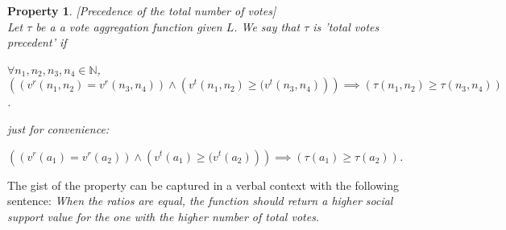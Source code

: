 \documentclass{article}
\newtheorem{property}{Property}
\newtheorem{conjecture}{Conjecture}
\newcommand{\nat}{\mathbb{N}}   %
\newcommand{\valueset}{L}
\begin{document}
\begin{property}
\label{P3}[Precedence of the total number of votes] \\
Let $\tau$ be a a vote aggregation function given $\valueset$. We say that $\tau$ is 'total votes precedent' if
\begin{center}
 $\forall n_1, n_2, n_3, n_4 \in \nat$,  \\
$\left( \left(v^{r}(n_{1}, n_{2}) = v^{r}(n_{3}, n_{4}) \right) \land  \left( v^{t}(n_{1}, n_{2}) \ge ( v^{t}(n_{3}, n_{4}) \right) \right) \implies \left( \tau(n_{1}, n_{2}) \ge \tau(n_{3}, n_{4}) \right)$. 
\\
{\color{teal}
just for convenience:

 $\left( \left(v^{r}(a_{1}) = v^{r}(a_{2}) \right) \land  \left( v^{t}(a_{1}) \ge ( v^{t}(a_{2}) \right) \right) \implies \left( \tau(a_1) \ge \tau(a_2) \right)$. 
}
\end{center}
\end{property}

The gist of the property can be captured in a verbal context with the following sentence: \emph{When the ratios are equal, the function should return a higher social support value for the one with the higher number of total votes.}  \\

\begin{comment}
\begin{conjecture}
Enhanced Vote Aggregation function enjoys Property \ref{P3}.
\end{conjecture}

\begin{proof}  [Sketch of proof] It should suffice to show that:
\\
 For two tuples $(v^+_1, v^-_1)$ and $(v^+_2, v^-_2)$, if $\frac{v^+_1} {v^-_1} = \frac{v^+_2} {v^-_2}$ and $( v^+_1 + v^-_1) \ge ( v^+_2 + v^-_2)$ then $\tau(v^+_1, v^-_1, v_{max}) \ge \tau(v^+_2, v^-_2, v_{max})$.
\end{proof}


As an example for $(v^+_1, v^-_1) = (45,5)$ and $(v^+_2, v^-_2) = (9,1)$, $v_{max} = 50$ and $\tau(v^+_1, v^-_1, v_{max}) = 0.8996$ and  $\tau(v^+_2, v^-_2, v_{max}) = 0.8982$

\end{comment}
\end{document}
